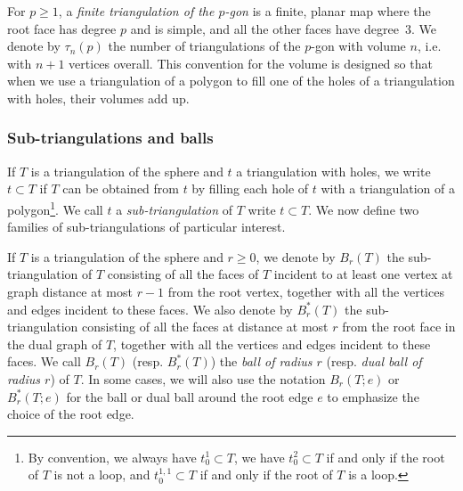 \documentclass[10pt]{amsart}
\theoremstyle{definition}\newtheorem{defi}[theo]{Definition}\newtheorem{rema}[theo]{Remark}\newtheorem{exam}[theo]{Example}\newtheorem{exem}[theo]{Example}\newtheorem{nota}[theo]{Notation}
\begin{document}
For $p \geq 1$, a \emph{finite triangulation of the $p$-gon} is a finite, planar map where the root face has degree $p$ and is simple, and all the other faces have degree~$3$. We denote by $\tau_n(p)$ the number of triangulations of the $p$-gon with volume $n$, i.e. with $n+1$ vertices overall. This convention for the volume is designed so that when we use a triangulation of a polygon to fill one of the holes of a triangulation with holes, their volumes add up.


\subsubsection*{Sub-triangulations and balls}
If $T$ is a triangulation of the sphere and $t$ a triangulation with holes, we write $t \subset T$ if $T$ can be obtained from $t$ by filling each hole of $t$ with a triangulation of a polygon\footnote{By convention, we always have $t^1_0 \subset T$, we have $t^2_0 \subset T$ if and only if the root of $T$ is not a loop, and $t^{1,1}_0 \subset T$ if and only if the root of $T$ is a loop.}. We call $t$ a \emph{sub-triangulation} of $T$ write $t \subset T$. We now define two families of sub-triangulations of particular interest.

If $T$ is a triangulation of the sphere and $r \geq 0$, we denote by $B_r(T)$ the sub-triangulation of $T$ consisting of all the faces of $T$ incident to at least one vertex at graph distance at most $r-1$ from the root vertex, together with all the vertices and edges incident to these faces. We also denote by $B_r^*(T)$ the sub-triangulation consisting of all the faces at distance at most $r$ from the root face in the dual graph of $T$, together with all the vertices and edges incident to these faces. We call $B_r(T)$ (resp. $B_r^*(T)$) the \emph{ball of radius $r$} (resp. \emph{dual ball of radius $r$}) of $T$. In some cases, we will also use the notation $B_r(T;e)$ or $B_r^*(T;e)$ for the ball or dual ball around the root edge $e$ to emphasize the choice of the root edge.
\end{document}
